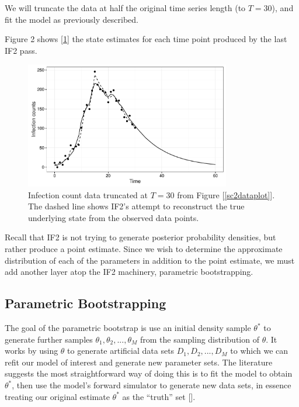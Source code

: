 	We will truncate the data at half the original time series length (to $T = 30$), and fit the model as previously described.

	Figure 2 shows [\ref{if2fit}] the state estimates for each time point produced by the last IF2 pass.

	\begin{figure}
        \centering
        \captionsetup{width=.8\linewidth}
        \includegraphics[width=0.8\textwidth]{./images/if2fit.pdf}
        \caption{Infection count data truncated at $T = 30$ from Figure [\ref{sc2dataplot}]. The dashed line shows IF2's attempt to reconstruct the true underlying state from the observed data points. \label{if2fit}}
    \end{figure}

    Recall that IF2 is not trying to generate posterior probability densities, but rather produce a point estimate. Since we wish to determine the approximate distribution of each of the parameters in addition to the point estimate, we must add another layer atop the IF2 machinery, parametric bootstrapping.


\subsection{Parametric Bootstrapping}

	The goal of the parametric bootstrap is use an initial density sample $\theta^*$ to generate further samples $\theta_1, \theta_2, ..., \theta_M$ from the sampling distribution of $\theta$. It works by using $\theta$ to generate artificial data sets $D_1, D_2, ..., D_M$ to which we can refit our model of interest and generate new parameter sets. The literature suggests the most straightforward way of doing this is to fit the model to obtain $\theta^*$, then use the model's forward simulator to generate new data sets, in essence treating our original estimate $\theta^*$ as the ``truth'' set [\cite{Genest2008}].

